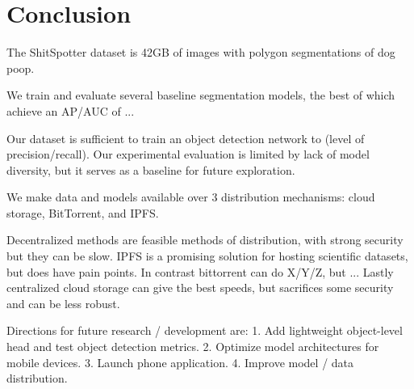 \documentclass[10pt,twocolumn,letterpaper]{article}
\begin{document}
\section{Conclusion}

The ShitSpotter dataset is 42GB of images with polygon segmentations of dog
poop. 

We train and evaluate several baseline segmentation models, the best of which 
achieve an AP/AUC of ...

Our dataset is sufficient to train an object detection network to (level of
precision/recall).
Our experimental evaluation is limited by lack of model diversity, but it
serves as a baseline for future exploration.

We make data and models available over 3 distribution mechanisms: 
cloud storage, BitTorrent, and IPFS.

Decentralized methods are feasible methods of distribution, with strong
security but they can be slow.
IPFS is a promising solution for hosting scientific datasets, but does have pain points.
In contrast bittorrent can do X/Y/Z, but ...
Lastly centralized cloud storage can give the best speeds, but sacrifices some
security and can be less robust.

Directions for future research / development are:
1. Add lightweight object-level head and test object detection metrics.
2. Optimize model architectures for mobile devices.
3. Launch phone application.
4. Improve model / data distribution.


{\small


}
%


\begin{comment}
    cd $HOME/code/shitspotter
    python -m shitspotter.cli.coco_annotation_stats $HOME/data/dvc-repos/shitspotter_dvc/data.kwcoco.json \
        --dst_fpath $HOME/code/shitspotter/coco_annot_stats/stats.json \
        --dst_dpath $HOME/code/shitspotter/coco_annot_stats

    SeeAlso:
    ~/code/shitspotter/experiments/run_pixel_eval_pipeline.sh
    ~/code/shitspotter/experiments/run_pixel_eval_on_test_pipeline.sh

    python ~/code/shitspotter/dev/poc/estimate_train_resources.py

    See: ./localize_figures.sh
\end{comment}
\end{document}
